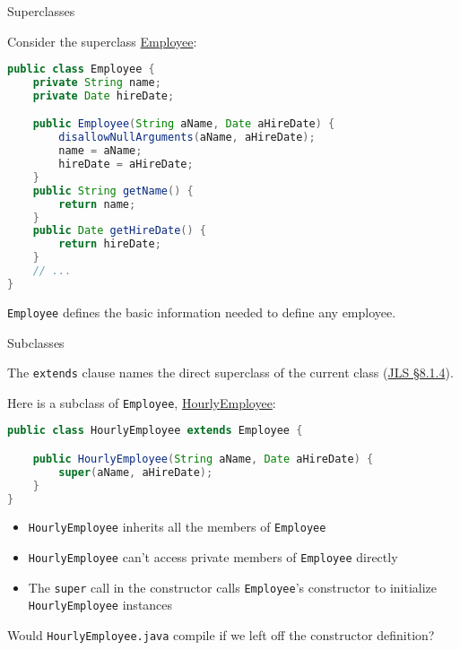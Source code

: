 \documentclass{beamer}
\newcommand{\code}{http://www.cc.gatech.edu/~simpkins/teaching/gatech/cs1331/code}
\begin{document}
\begin{frame}[fragile]{Superclasses}


Consider the superclass \href{\code/Employee.java}{Employee}:
\begin{lstlisting}[language=Java]
public class Employee {
    private String name;
    private Date hireDate;

    public Employee(String aName, Date aHireDate) {
        disallowNullArguments(aName, aHireDate);
        name = aName;
        hireDate = aHireDate;
    }
    public String getName() {
        return name;
    }
    public Date getHireDate() {
        return hireDate;
    }
    // ...
}
\end{lstlisting}

{\tt Employee} defines the basic information needed to define any employee.

\end{frame}

\begin{frame}[fragile]{Subclasses}


The {\tt extends} clause names the direct superclass of the current class (\href{http://docs.oracle.com/javase/specs/jls/se7/html/jls-8.html#jls-8.1.4)}{JLS \S 8.1.4}).

Here is a subclass of {\tt Employee},  \href{\code/HourlyEmployee.java}{HourlyEmployee}:
\begin{lstlisting}[language=Java]
public class HourlyEmployee extends Employee {

    public HourlyEmployee(String aName, Date aHireDate) {
        super(aName, aHireDate);
    }
}
\end{lstlisting}

\begin{itemize}
\item {\tt HourlyEmployee} inherits all the members of {\tt Employee}
\item {\tt HourlyEmployee} can't access private members of {\tt Employee} directly
\item The {\tt super} call in the constructor calls {\tt Employee}'s constructor to initialize {\tt HourlyEmployee} instances
\end{itemize}

Would {\tt HourlyEmployee.java} compile if we left off the constructor definition?
\end{frame}
\end{document}
